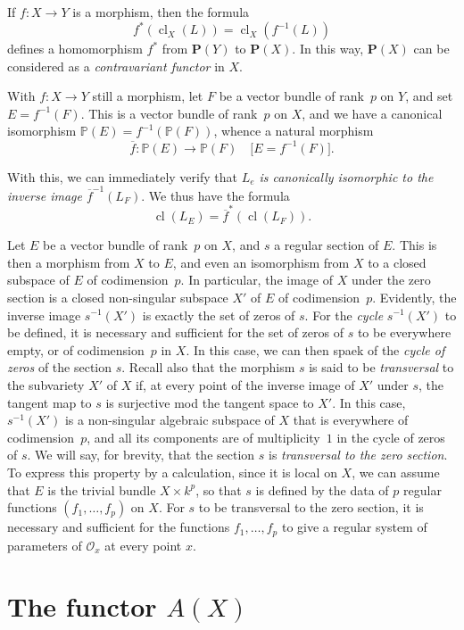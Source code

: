 \documentclass{article}
\theoremstyle{plain}
\theoremstyle{definition}
\newcommand{\sh}{\mathscr}
\newcommand{\PP}{\mathbf{P}}
\DeclareMathOperator{\cl}{cl}
\begin{document}
If $f\colon X\to Y$ is a morphism, then the formula
\[
  f^*(\cl_X(L)) = \cl_X(f^{-1}(L))
\]
defines a homomorphism $f^*$ from $\PP(Y)$ to $\PP(X)$.
In this way, $\PP(X)$ can be considered as a \emph{contravariant functor} in $X$.

With $f\colon X\to Y$ still a morphism, let $F$ be a vector bundle of rank~$p$ on $Y$, and set $E=f^{-1}(F)$.
This is a vector bundle of rank~$p$ on $X$, and we have a canonical isomorphism $\mathbb{P}(E)=f^{-1}(\mathbb{P}(F))$, whence a natural morphism
\[
  \overline{f}\colon \mathbb{P}(E) \to \mathbb{P}(F)
  \quad\mbox{[$E=f^{-1}(F)$].}
\]

With this, we can immediately verify that \emph{$L_e$ is canonically isomorphic to the inverse image $\overline{f}^{-1}(L_F)$}.
We thus have the formula
\[
  \cl(L_E) = \overline{f}^*(\cl(L_F)).
\]

Let $E$ be a vector bundle of rank~$p$ on $X$, and $s$ a regular section of $E$.
This is then a morphism from $X$ to $E$, and even an isomorphism from $X$ to a closed subspace of $E$ of codimension~$p$.
In particular, the image of $X$ under the zero section is a closed non-singular subspace $X'$ of $E$ of codimension~$p$.
Evidently, the inverse image $s^{-1}(X')$ is exactly the set of zeros of $s$.
For the \emph{cycle} $s^{-1}(X')$ to be defined, it is necessary and sufficient for the set of zeros of $s$ to be everywhere empty, or of codimension~$p$ in $X$.
In this case, we can then spaek of the \emph{cycle of zeros} of the section $s$.
Recall also that the morphism $s$ is said to be \emph{transversal} to the subvariety $X'$ of $X$ if, at every point of the inverse image of $X'$ under $s$, the tangent map to $s$ is surjective mod the tangent space to $X'$.
In this case, $s^{-1}(X')$ is a non-singular algebraic subspace of $X$ that is everywhere of codimension~$p$, and all its components are of multiplicity~$1$ in the cycle of zeros of $s$.
We will say, for brevity, that the section $s$ is \emph{transversal to the zero section}.
To express this property by a calculation, since it is local on $X$, we can assume that $E$ is the trivial bundle $X\times k^p$, so that $s$ is defined by the data of $p$ regular functions $(f_1,\ldots,f_p)$ on $X$.
For $s$ to be transversal to the zero section, it is necessary and sufficient for the functions $f_1,\ldots,f_p$ to give a regular system of parameters of $\sh{O}_x$ at every point $x$.


\section{The functor $A(X)$}
\label{section2}
\end{document}
